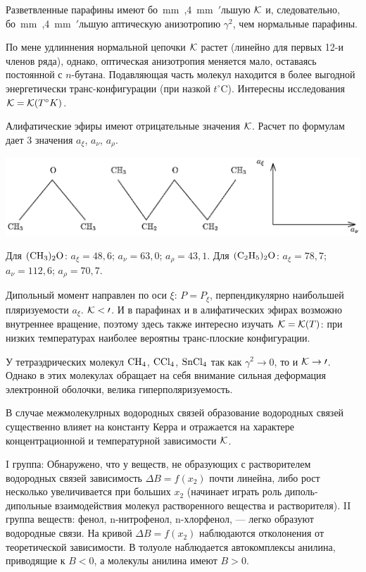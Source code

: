 Разветвленные парафины имеют \hbox{бо  mm ,4 mm
\hbox{$'$}льшую} $\cal K$ и, следовательно,
\hbox{бо  mm ,4 mm
\hbox{$'$}льшую} аптическую анизотропию $\gamma^2$, чем нормальные
парафины. \eject \par По мене удлиннения нормальной  цепочки $\cal K$ растет
(линейно для первых 12-и членов ряда), однако, оптическая
анизотропия меняется мало, оставаясь постоянной с $n$-бутана.
Подавляющая часть молекул находится в более выгодной
энергетически транс-конфигурации (при назкой $t^{\circ}$C).
Интересны исследования $\cal K=K(\mit T^{\circ}K)$.
\par Алифатические эфиры имеют отрицательные значения $\cal K$.
Расчет по формулам дает 3 значения $a_{\xi}$, $a_{\nu}$,
$a_{\rho}$.

\centerline{\hbox{\includegraphics[scale=0.69]{Ris/ris_eps/eff_kerr/alif.eps}}}

 Для $\rm (CH_3)_2O$: $a_{\xi}=48,6$; $a_{\nu}=63,0$;
$a_{\rho}=43,1$.
 Для $\rm (C_2H_5)_2O$: $a_{\xi}=78,7$; $a_{\nu}=112,6$;
$a_{\rho}=70,7$.\par
Дипольный момент направлен по оси $\xi$: $P=P_{\xi}$,
перпендикулярно наибольшей пляризуемости $a_{\xi}$. $\cal K<0$.
И в парафинах и в алифатических эфирах возможно внутреннее
вращение, поэтому здесь также интересно изучать $\cal K=K(\mit
T)$: при низких температурах наиболее вероятны транс-плоские
конфигурации.\par
У тетраэдрических молекул $\rm CH_4$, $\rm CCl_4$, $\rm SnCl_4$ так
как $\gamma^2\rightarrow 0$, то и $\cal K\rightarrow 0$. Однако в
этих молекулах обращает на себя внимание сильная деформация
электронной оболочки, велика гиперполяризуемость.\par
В случае межмолекулрных водородных связей образование водородных
связей существенно влияет на константу Керра и отражается на
характере концентрационной и температурной зависимости $\cal K$.
\par I группа: Обнаружено, что у веществ, не образующих с
растворителем водородных связей зависимость $\Delta B=f(x_2)$
почти линейна, либо рост несколько увеличивается при больших
$x_2$ (начинает играть роль диполь-дипольные взаимодействия
молекул растворенного вещества и растворителя).
II группа веществ: фенол, n-нитрофенол, n-хлорфенол, --- легко
образуют водородные связи. На кривой $\Delta B=f(x_2)$
наблюдаются отколонения от теоретической зависимости. В толуоле
наблюдается автокомплексы анилина, приводящие к $B<0$, а молекулы
анилина имеют $B>0$.

